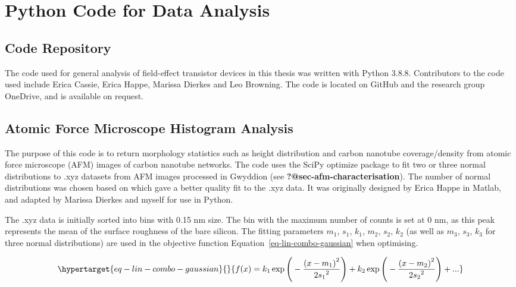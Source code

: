 \documentclass[
  a4paper,
]{scrbook}
\begin{document}
\hypertarget{sec-python}{%
\chapter{Python Code for Data Analysis}\label{sec-python}}

\hypertarget{code-repository}{%
\section{Code Repository}\label{code-repository}}

The code used for general analysis of field-effect transistor devices in
this thesis was written with Python 3.8.8. Contributors to the code used
include Erica Cassie, Erica Happe, Marissa Dierkes and Leo Browning. The
code is located on GitHub and the research group OneDrive, and is
available on request.

\hypertarget{sec-histogram-analysis}{%
\section{Atomic Force Microscope Histogram
Analysis}\label{sec-histogram-analysis}}

The purpose of this code is to return morphology statistics such as
height distribution and carbon nanotube coverage/density from atomic
force microscope (AFM) images of carbon nanotube networks. The code uses
the SciPy optimize package to fit two or three normal distributions to
.xyz datasets from AFM images processed in Gwyddion (see
\textbf{?@sec-afm-characterisation}). The number of normal distributions
was chosen based on which gave a better quality fit to the .xyz data. It
was originally designed by Erica Happe in Matlab, and adapted by Marissa
Dierkes and myself for use in Python.

The .xyz data is initially sorted into bins with 0.15 nm size. The bin
with the maximum number of counts is set at 0 nm, as this peak
represents the mean of the surface roughness of the bare silicon. The
fitting parameters \(m_1\), \(s_1\), \(k_1\), \(m_2\), \(s_2\), \(k_2\)
(as well as \(m_3\), \(s_3\), \(k_3\) for three normal distributions)
are used in the objective function Equation~\ref{eq-lin-combo-gaussian}
when optimising.

\begin{equation}\protect\hypertarget{eq-lin-combo-gaussian}{}{
f(x) = k_1\exp{\Bigg(-\frac{{(x-m_1)}^{2}}{{2s_1}^{2}}\Bigg)} + k_2\exp{\Bigg(-\frac{{(x-m_2)}^{2}}{{2s_2}^{2}}\Bigg)} + ...
}\label{eq-lin-combo-gaussian}\end{equation}
\end{document}

